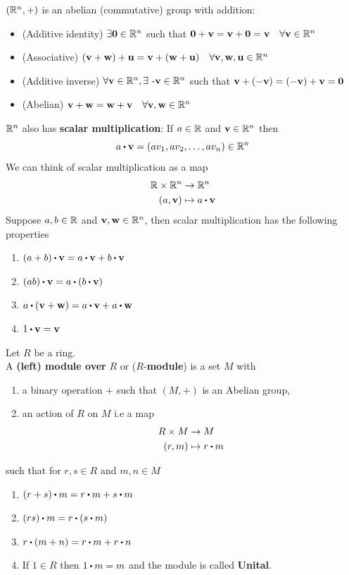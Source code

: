\documentclass[../Main.tex]{subfiles}
\begin{document}
\Note $(\mathbb{R}^n,+) $ is an abelian (commutative) group with addition:
\begin{itemize}
	\item (Additive identity) $\exists \mathbf{0} \in \mathbb{R}^n$ such that $\mathbf{0} + \mathbf{v} = \mathbf{v} + \mathbf{0} = \mathbf{v} \quad \forall \mathbf{v} \in \mathbb{R}^n$
	\item (Associative) $(\mathbf{v} +\mathbf{w}) + \mathbf{u} = \mathbf{v} + (\mathbf{w} + \mathbf{u}) \quad \forall \mathbf{v},\mathbf{w},\mathbf{u} \in \mathbb{R}^n$
	\item (Additive inverse) $\forall \mathbf{v} \in \mathbb{R}^n, \exists\,\, \text{-}\mathbf{v} \in \mathbb{R}^n$ such that $\mathbf{v} + (-\mathbf{v}) = (-\mathbf{v} ) + \mathbf{v} = \mathbf{0}$
	\item (Abelian) $\mathbf{v} + \mathbf{w} = \mathbf{w} + \mathbf{v} \quad \forall \mathbf{v},\mathbf{w} \in \mathbb{R}^n$ 
\end{itemize}
$\mathbb{R}^n$ also has \textbf{scalar multiplication}: If $a\in \mathbb{R}$ and $\mathbf{v} \in \mathbb{R}^n$ then
\[a\rdot \vv = (av_1,av_2,\dots,av_n) \in \R^n \]
We can think of scalar multiplication as a map
\begin{align*}
\R \times \R^n &\to \R^n\\
(a,\vv)&\mapsto a\rdot \vv
\end{align*}
Suppose $a,b\in \mathbb{R}$ and $\mathbf{v},\mathbf{w} \in \mathbb{R}^n$, then scalar multiplication has the following properties
\begin{enumerate}[label=(\arabic*)]
	\item $(a+b)\rdot \vv = a\rdot \vv + b\rdot \vv$
	\item $(ab)\rdot \vv = a\rdot (b\rdot \vv)$
	\item $a\rdot (\vv + \vw) = a\rdot \vv + a \rdot \vw$
	\item $1\rdot \vv = \vv$
\end{enumerate}
\begin{dfn}[title = \texorpdfstring{$R$}{R}-module]
	Let $R$ be a ring.\\
	A \textbf{(left) module over }$R$ or ($R$-\textbf{module}) is a set $M$ with
	\begin{enumerate}[label=(\arabic*)]
		\item a binary operation $+$ such that $(M,+)$ is an Abelian group,
		\item an action of $R$ on $M$ i.e a map
		\begin{align*}
		R\times M &\to M \\
		(r,m) &\mapsto r\rdot m
		\end{align*}
	\end{enumerate}
	such that for $r,s\in R$ and $m,n\in M$
	\begin{enumerate}[label=(\roman*)]
		\item $(r+s)\rdot m = r\rdot m + s\rdot m$
		\item $(rs)\rdot m = r\rdot (s\rdot m)$
		\item $r\rdot (m+n) = r\rdot m + r\rdot n$
		\item If $1 \in R$ then $1 \rdot m = m$ and the module is called \textbf{Unital}.
	\end{enumerate}
\end{dfn}
\end{document}
